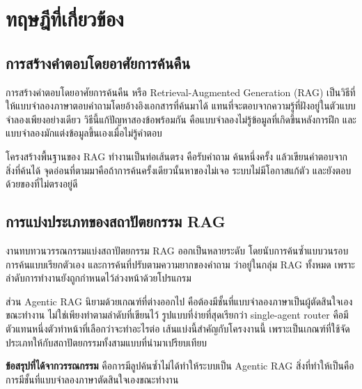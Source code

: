 
\section{ทฤษฎีที่เกี่ยวข้อง}

\subsection{การสร้างคำตอบโดยอาศัยการค้นคืน}

การสร้างคำตอบโดยอาศัยการค้นคืน หรือ Retrieval-Augmented Generation (RAG) เป็นวิธีที่ให้แบบจำลองภาษาตอบคำถามโดยอ้างอิงเอกสารที่ค้นมาได้ แทนที่จะตอบจากความรู้ที่ฝังอยู่ในตัวแบบจำลองเพียงอย่างเดียว \cite{lewis2020rag} วิธีนี้แก้ปัญหาสองข้อพร้อมกัน คือแบบจำลองไม่รู้ข้อมูลที่เกิดขึ้นหลังการฝึก และแบบจำลองมักแต่งข้อมูลขึ้นเองเมื่อไม่รู้คำตอบ

โครงสร้างพื้นฐานของ RAG ทำงานเป็นท่อเส้นตรง คือรับคำถาม ค้นหนึ่งครั้ง แล้วเขียนคำตอบจากสิ่งที่ค้นได้ จุดอ่อนที่ตามมาคือถ้าการค้นครั้งเดียวนั้นหาของไม่เจอ ระบบไม่มีโอกาสแก้ตัว และยังตอบด้วยของที่ไม่ตรงอยู่ดี \cite{gao2023survey}

\subsection{การแบ่งประเภทของสถาปัตยกรรม RAG}

งานทบทวนวรรณกรรมแบ่งสถาปัตยกรรม RAG ออกเป็นหลายระดับ \cite{gao2024modular} โดยนับการค้นซ้ำแบบวนรอบ การค้นแบบเรียกตัวเอง และการค้นที่ปรับตามความยากของคำถาม ว่าอยู่ในกลุ่ม RAG ทั้งหมด เพราะลำดับการทำงานยังถูกกำหนดไว้ล่วงหน้าด้วยโปรแกรม

ส่วน Agentic RAG นิยามด้วยเกณฑ์ที่ต่างออกไป คือต้องมีชั้นที่แบบจำลองภาษาเป็นผู้ตัดสินใจเองขณะทำงาน ไม่ใช่เพียงทำตามลำดับที่เขียนไว้ \cite{singh2025agentic} รูปแบบที่ง่ายที่สุดเรียกว่า single-agent router คือมีตัวแทนหนึ่งตัวทำหน้าที่เลือกว่าจะทำอะไรต่อ เส้นแบ่งนี้สำคัญกับโครงงานนี้ เพราะเป็นเกณฑ์ที่ใช้จัดประเภทให้กับสถาปัตยกรรมทั้งสามแบบที่นำมาเปรียบเทียบ

\textbf{ข้อสรุปที่ได้จากวรรณกรรม} คือการมีลูปค้นซ้ำไม่ได้ทำให้ระบบเป็น Agentic RAG สิ่งที่ทำให้เป็นคือการมีชั้นที่แบบจำลองภาษาตัดสินใจเองขณะทำงาน

